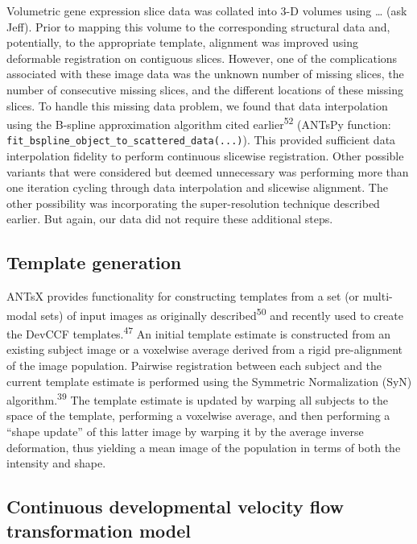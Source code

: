 \documentclass[
  12pt,
]{article}
\begin{document}
Volumetric gene expression slice data was collated into 3-D volumes
using \ldots{} (ask Jeff). Prior to mapping this volume to the
corresponding structural data and, potentially, to the appropriate
template, alignment was improved using deformable registration on
contiguous slices. However, one of the complications associated with
these image data was the unknown number of missing slices, the number of
consecutive missing slices, and the different locations of these missing
slices. To handle this missing data problem, we found that data
interpolation using the B-spline approximation algorithm cited
earlier\textsuperscript{52} (ANTsPy function:
\texttt{fit\_bspline\_object\_to\_scattered\_data(...)}). This provided
sufficient data interpolation fidelity to perform continuous slicewise
registration. Other possible variants that were considered but deemed
unnecessary was performing more than one iteration cycling through data
interpolation and slicewise alignment. The other possibility was
incorporating the super-resolution technique described earlier. But
again, our data did not require these additional steps.

\hypertarget{template-generation}{%
\subsection*{Template generation}\label{template-generation}}

ANTsX provides functionality for constructing templates from a set (or
multi-modal sets) of input images as originally
described\textsuperscript{50} and recently used to create the DevCCF
templates.\textsuperscript{47} An initial template estimate is
constructed from an existing subject image or a voxelwise average
derived from a rigid pre-alignment of the image population. Pairwise
registration between each subject and the current template estimate is
performed using the Symmetric Normalization (SyN)
algorithm.\textsuperscript{39} The template estimate is updated by
warping all subjects to the space of the template, performing a
voxelwise average, and then performing a ``shape update'' of this latter
image by warping it by the average inverse deformation, thus yielding a
mean image of the population in terms of both the intensity and shape.

\hypertarget{continuous-developmental-velocity-flow-transformation-model}{%
\subsection*{Continuous developmental velocity flow transformation
model}\label{continuous-developmental-velocity-flow-transformation-model}}
\end{document}
